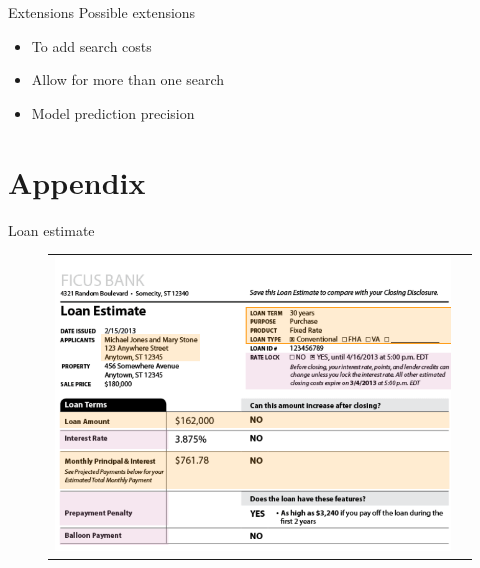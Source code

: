 \documentclass[10pt,aspectratio=169]{beamer}
\begin{document}
\begin{frame}{Extensions}
Possible extensions
\begin{itemize}
    \item To add search costs
    \item Allow for more than one search 
    \item Model prediction precision 
\end{itemize}
\end{frame}


\section{Appendix}


\begin{frame}{Loan estimate}\label{slide:fig_LE}    
\begin{figure}[H]
\centering{}%
\begin{tabular}{cc}
\includegraphics[scale=0.42]{../figures/docs_screenshots/Loan Estimate_cut.png}
\end{tabular}
\end{figure}
\hyperlink{slide:motivation}{}
\end{frame}
\end{document}
